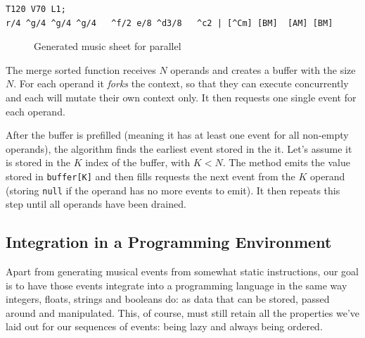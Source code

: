 \documentclass[a4paper,UKenglish,cleveref, autoref]{oasics-v2019}
\begin{document}
\begin{lstlisting}[caption={Snippet of Soft to Be Strong by Marina},label=list:6,captionpos=t,abovecaptionskip=-\medskipamount]
T120 V70 L1;
r/4 ^g/4 ^g/4 ^g/4   ^f/2 e/8 ^d3/8   ^c2 | [^Cm] [BM]  [AM] [BM] 
\end{lstlisting}

\begin{figure}[ht]
  \centering
  {%
  \setlength{\fboxsep}{0pt}%
  \setlength{\fboxrule}{0pt}%
  }%
  \caption{Generated music sheet for parallel}
  \label{fig:parallel}
\end{figure}


The merge sorted function receives $N$ operands and creates a buffer with the size $N$. For each operand it \textit{forks} the context, so that they can execute concurrently and each will mutate their own context only. It then requests one single event for each operand.

After the buffer is prefilled (meaning it has at least one event for all non-empty operands), the algorithm finds the earliest event stored in the it. Let's assume it is stored in the $K$ index of the buffer, with $K < N$. The method emits the value stored in \texttt{buffer[K]} and then fills requests the next event from the $K$ operand (storing \texttt{null} if the operand has no more events to emit). It then repeats this step until all operands have been drained.

\subsection{Integration in a Programming Environment}
Apart from generating musical events from somewhat static instructions, our goal is to have those events integrate into a programming language in the same way integers, floats, strings and booleans do: as data that can be stored, passed around and manipulated. This, of course, must still retain all the properties we've laid out for our sequences of events: being lazy and always being ordered.
\end{document}
